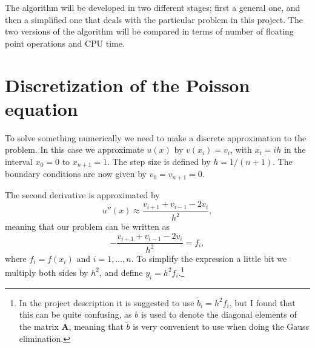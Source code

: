 \documentclass[12pt, a4paper]{article}
\begin{document}
The algorithm will be developed in two different stages; first a general one, and then a simplified 
one that deals with the particular problem in this project. The two versions of the algorithm will be 
compared in terms of number of floating point operations and CPU time. 

\section{Discretization of the Poisson equation}

To solve something numerically we need to make a discrete approximation to the problem. In this case 
we approximate $u(x)$ by $v(x_i)=v_i$, with $x_i=ih$ in the interval $x_0=0$ to $x_{n+1}=1$. The step 
size is defined by $h=1/(n+1)$. The boundary conditions are now given by $v_0 = v_{n+1} = 0$.   

The second derivative is approximated by 
\begin{equation}
u''(x) \approx \frac{v_{i+1} + v_{i-1} - 2v_i}{h^2}, 
\end{equation}
meaning that our problem can be written as 
\begin{equation}
-\frac{v_{i+1} + v_{i-1} - 2v_i}{h^2} = f_i, 
\label{poisson_disc}
\end{equation}
where $f_i = f(x_i)$ and $i=1,\dots,n$. To simplify the expression a little bit we multiply both sides by 
$h^2$, and define $y_i = h^2 f_i$.\footnote{In the project description it is suggested to use 
$\tilde{b}_i = h^2 f_i$, but I found that this can be quite confusing, as $b$ is used to denote 
the diagonal elements of the matrix $\mathbf{A}$, meaning that $\tilde{b}$ is very convenient to use when 
doing the Gauss elimination.}  
\end{document}
